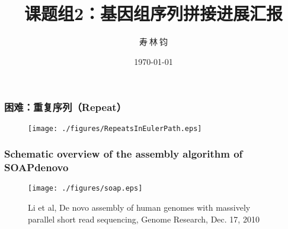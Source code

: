 \documentclass[mathserif]{beamer}
\title{课题组2：基因组序列拼接进展汇报}
\author{ 寿$\ $林$\ $钧}
\institute{中科院计算所}
\date{\today}
\begin{document}
	

	\begin{frame}
		\titlepage
	\end{frame}

	\begin{frame}
		\frametitle{困难：重复序列（Repeat）}
                          \begin{figure}
				\centering
				\texttt{[image: ./figures/RepeatsInEulerPath.eps]}
			\end{figure}
		
	\end{frame}

	\begin{frame}
		\frametitle{Schematic overview of the assembly algorithm of SOAPdenovo}
			\begin{figure}
				\centering
				\texttt{[image: ./figures/soap.eps]}
				\caption{\tiny Li et al, De novo assembly of human genomes with massively parallel short read sequencing, Genome Research, Dec. 17, 2010}
			\end{figure}
	\end{frame}
	
\end{document}
